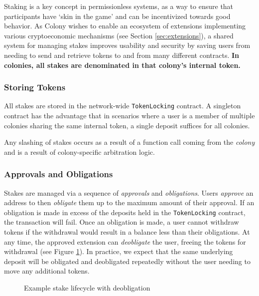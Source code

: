 Staking is a key concept in permissionless systems, as a way to ensure that participants have `skin in the game' and can be incentivized towards good behavior. As Colony wishes to enable an ecosystem of extensions implementing various cryptoeconomic mechanisms (see Section \ref{sec:extensions}), a shared system for managing stakes improves usability and security by saving users from needing to send and retrieve tokens to and from many different contracts. \textbf{In colonies, all stakes are denominated in that colony's internal token.}

\subsubsection{Storing Tokens}

All stakes are stored in the network-wide \texttt{TokenLocking} contract. A singleton contract has the advantage that in scenarios where a user is a member of multiple colonies sharing the same internal token, a single deposit suffices for all colonies.

Any slashing of stakes occurs as a result of a function call coming from the \textit{colony} and is a result of colony-specific arbitration logic.

\subsubsection{Approvals and Obligations}

Stakes are managed via a sequence of \textit{approvals} and \textit{obligations}. Users \textit{approve} an address to then \textit{obligate} them up to the maximum amount of their approval. If an obligation is made in excess of the deposits held in the \texttt{TokenLocking} contract, the transaction will fail. Once an obligation is made, a user cannot withdraw tokens if the withdrawal would result in a balance less than their obligations. At any time, the approved extension can \textit{deobligate} the user, freeing the tokens for withdrawal (see Figure \ref{fig:stake-deobligate}). In practice, we expect that the same underlying deposit will be obligated and deobligated repeatedly without the user needing to move any additional tokens.

\begin{figure}[h]
    \centering
{}
 \caption{Example stake lifecycle with deobligation}
 \label{fig:stake-deobligate}
\end{figure}

